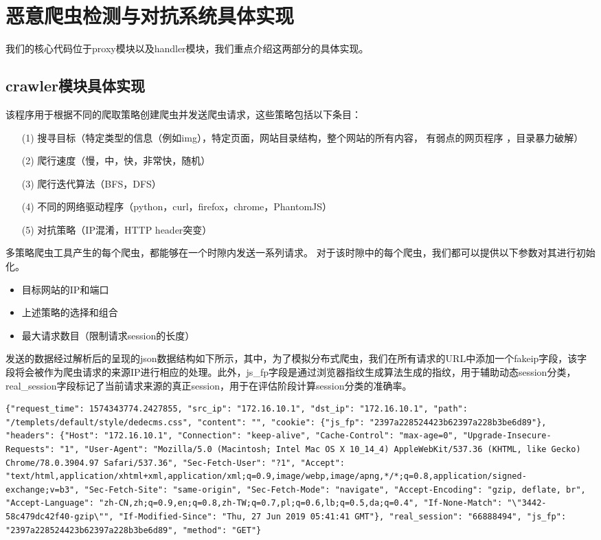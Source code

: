 \documentclass[doctor,privacy,twoside]{buaa_mac}
\begin{document}
\section{恶意爬虫检测与对抗系统具体实现}
我们的核心代码位于proxy模块以及handler模块，我们重点介绍这两部分的具体实现。

\subsection{crawler模块具体实现}
该程序用于根据不同的爬取策略创建爬虫并发送爬虫请求，这些策略包括以下条目：

\begin{itemize}
\item[(1)] 搜寻目标（特定类型的信息（例如img），特定页面，网站目录结构，整个网站的所有内容， 有弱点的网页程序 ，目录暴力破解）
\item[(2)] 爬行速度（慢，中，快，非常快，随机）
\item[(3)] 爬行迭代算法（BFS，DFS）
\item[(4)] 不同的网络驱动程序（python，curl，firefox，chrome，PhantomJS）
\item[(5)] 对抗策略（IP混淆，HTTP header突变）
\end {itemize}

多策略爬虫工具产生的每个爬虫，都能够在一个时隙内发送一系列请求。 对于该时隙中的每个爬虫，我们都可以提供以下参数对其进行初始化。

\begin{itemize}
\item 目标网站的IP和端口
\item 上述策略的选择和组合
\item 最大请求数目（限制请求session的长度）
\end {itemize}

发送的数据经过解析后的呈现的json数据结构如下所示，其中，为了模拟分布式爬虫，我们在所有请求的URL中添加一个fakeip字段，该字段将会被作为爬虫请求的来源IP进行相应的处理。此外，js\_{}fp字段是通过浏览器指纹生成算法生成的指纹，用于辅助动态session分类，real\_{}session字段标记了当前请求来源的真正session，用于在评估阶段计算session分类的准确率。
\centerline{}
\lstset{language=JavaScript}
\begin{lstlisting}
{"request_time": 1574343774.2427855, "src_ip": "172.16.10.1", "dst_ip": "172.16.10.1", "path": "/templets/default/style/dedecms.css", "content": "", "cookie": {"js_fp": "2397a228524423b62397a228b3be6d89"}, "headers": {"Host": "172.16.10.1", "Connection": "keep-alive", "Cache-Control": "max-age=0", "Upgrade-Insecure-Requests": "1", "User-Agent": "Mozilla/5.0 (Macintosh; Intel Mac OS X 10_14_4) AppleWebKit/537.36 (KHTML, like Gecko) Chrome/78.0.3904.97 Safari/537.36", "Sec-Fetch-User": "?1", "Accept": "text/html,application/xhtml+xml,application/xml;q=0.9,image/webp,image/apng,*/*;q=0.8,application/signed-exchange;v=b3", "Sec-Fetch-Site": "same-origin", "Sec-Fetch-Mode": "navigate", "Accept-Encoding": "gzip, deflate, br", "Accept-Language": "zh-CN,zh;q=0.9,en;q=0.8,zh-TW;q=0.7,pl;q=0.6,lb;q=0.5,da;q=0.4", "If-None-Match": "\"3442-58c479dc42f40-gzip\"", "If-Modified-Since": "Thu, 27 Jun 2019 05:41:41 GMT"}, "real_session": "66888494", "js_fp": "2397a228524423b62397a228b3be6d89", "method": "GET"}
\end{lstlisting}
\end{document}
